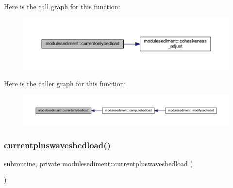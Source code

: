 Here is the call graph for this function\+:\nopagebreak
\begin{figure}[H]
\begin{center}
\leavevmode
\includegraphics[width=350pt]{namespacemodulesediment_a099f230f690695fa4061449e8880d0e7_cgraph}
\end{center}
\end{figure}
Here is the caller graph for this function\+:\nopagebreak
\begin{figure}[H]
\begin{center}
\leavevmode
\includegraphics[width=350pt]{namespacemodulesediment_a099f230f690695fa4061449e8880d0e7_icgraph}
\end{center}
\end{figure}
\mbox{\label{namespacemodulesediment_ab4e81d1c3c2244f9bb0f378491adbc1e}} 
\subsubsection{\texorpdfstring{currentpluswavesbedload()}{currentpluswavesbedload()}}
{\footnotesize\ttfamily subroutine, private modulesediment\+::currentpluswavesbedload (\begin{DoxyParamCaption}{ }\end{DoxyParamCaption})\hspace{0.3cm}{\ttfamily [private]}}

